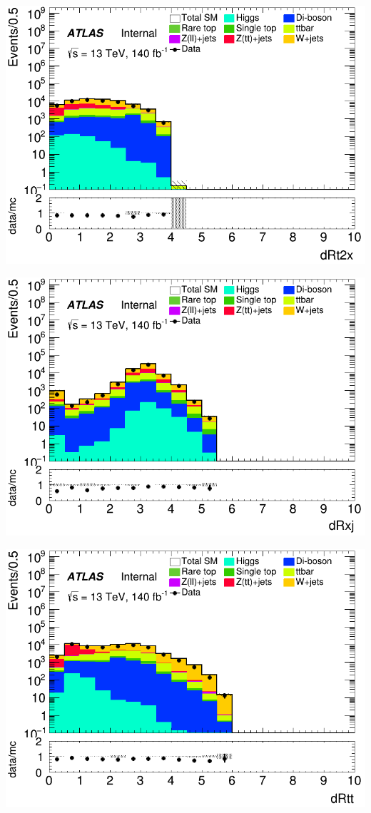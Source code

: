 \documentclass[usenames,dvipsnames]{beamer}
\begin{document}
\begin{frame}
    \begin{minipage}{0.32\textwidth}
        \centering
        \includegraphics[width=\textwidth]{graphics/LH_met/LH_met_dRt2x.png}
    \end{minipage}
    \hfill
    \begin{minipage}{0.32\textwidth}
        \centering
        \includegraphics[width=\textwidth]{graphics/LH_met/LH_met_dRxj.png}
    \end{minipage}
    \hfill
    \begin{minipage}{0.32\textwidth}
        \centering
        \includegraphics[width=\textwidth]{graphics/LH_met/LH_met_dRtt.png}

\end{minipage}
\end{frame}
\end{document}
